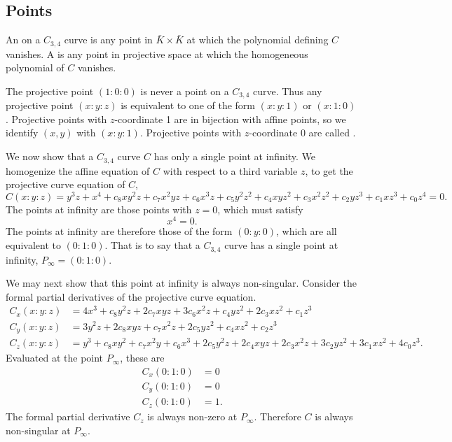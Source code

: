 \subsection{Points}

An  on a $C_{3,4}$ curve is any point in $\bar K \times \bar K$
at which the polynomial defining $C$ vanishes.
A  is any point in projective space at which the homogeneous polynomial of $C$ vanishes.

The projective point $(1 : 0 : 0)$ is never a point on a $C_{3,4}$ curve.
Thus any projective point $(x:y:z)$ is equivalent to one of the form $(x:y:1)$ or $(x:1:0)$.
Projective points with $z$-coordinate 1 are in bijection with affine points,
so we identify $(x,y)$ with $(x:y:1)$.
Projective points with $z$-coordinate 0 are called .

We now show that a $C_{3,4}$ curve $C$ has only a single point at infinity.
We homogenize the affine equation of $C$ with respect to a third variable $z$,
to get the projective curve equation of $C$,
  \[ C(x:y:z) = y^3z + x^4 + c_8xy^2z + c_7x^2yz + c_6x^3z + c_5y^2z^2 + c_4xyz^2 + c_3x^2z^2 + c_2yz^3 + c_1xz^3 + c_0z^4 = 0. \]
The points at infinity are those points with $z = 0$, which must satisfy
  \[ x^4 = 0. \]
The points at infinity are therefore those of the form $(0 : y : 0)$, which are all equivalent to $(0 : 1 : 0)$.
That is to say that a $C_{3,4}$ curve has a single point at infinity, $P_\infty = (0 : 1 : 0)$.

We may next show that this point at infinity is always non-singular.
Consider the formal partial derivatives of the projective curve equation.
\begin{align*}
  C_x(x:y:z) &= 4x^3 + c_8y^2z + 2c_7xyz + 3c_6x^2z + c_4yz^2 + 2c_3xz^2 + c_1z^3 \\
  C_y(x:y:z) &= 3y^2z + 2c_8xyz + c_7x^2z + 2c_5yz^2 + c_4xz^2 + c_2z^3 \\
  C_z(x:y:z) &= y^3 + c_8xy^2 + c_7x^2y + c_6x^3 + 2c_5y^2z + 2c_4xyz + 2c_3x^2z + 3c_2yz^2 + 3c_1xz^2 + 4c_0z^3.
\end{align*}
Evaluated at the point $P_\infty$, these are
\begin{align*}
  C_x(0:1:0) &= 0 \\
  C_y(0:1:0) &= 0 \\
  C_z(0:1:0) &= 1 .
\end{align*}
The formal partial derivative $C_z$ is always non-zero at $P_\infty$.
Therefore $C$ is always non-singular at $P_\infty$.


